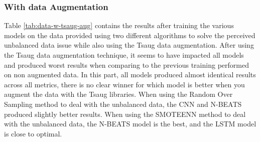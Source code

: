 \documentclass[conference]{IEEEtran}
\begin{document}
\subsubsection{With data Augmentation}
Table \ref{tab:data-w-tsaug-aug} contains the results after training the various models on the data provided using two different algorithms to solve the perceived unbalanced data issue while also using the Tsaug data augmentation. After using the Tsaug data augmentation technique, it seems to have impacted all models and produced worst results when comparing to the previous training performed on non augmented data. In this part, all models produced almost identical results across all metrics, there is no clear winner for which model is better when you augment the data with the Tsaug libraries. When using the Random Over Sampling method to deal with the unbalanced data, the CNN and N-BEATS produced slightly better results. When using the SMOTEENN method to deal with the unbalanced data, the N-BEATS model is the best, and the LSTM model is close to optimal. 
\end{document}
